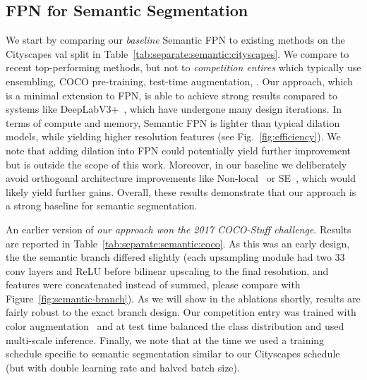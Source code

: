 \documentclass[10pt,twocolumn,letterpaper]{article}
\makeatletter
\newcommand{\x}{}
\renewcommand\paragraph{\@startsection{paragraph}{4}{\z@}{.5em \@plus1ex \@minus.1ex}{-.5em}{\normalfont\normalsize\bfseries}}
\makeatother
\begin{document}
{\subsection{FPN for Semantic Segmentation}

\paragraph{Cityscapes:} We start by comparing our \emph{baseline} Semantic FPN to existing methods on the Cityscapes val split in Table~\ref{tab:separate:semantic:cityscapes}. We compare to recent top-performing methods, but not to \emph{competition entires} which typically use ensembling, COCO pre-training, test-time augmentation, \etc. Our approach, which is a minimal extension to FPN, is able to achieve strong results compared to systems like DeepLabV3+~\cite{deeplabV3plus}, which have undergone many design iterations. In terms of compute and memory, Semantic FPN is lighter than typical dilation models, while yielding higher resolution features (see Fig.~\ref{fig:efficiency}). We note that adding dilation into FPN could potentially yield further improvement but is outside the scope of this work. Moreover, in our baseline we deliberately avoid orthogonal architecture improvements like Non-local~\cite{wang2018non} or SE~\cite{hu2017squeeze}, which would likely yield further gains. Overall, these results demonstrate that our approach is a strong baseline for semantic segmentation.

\paragraph{COCO:} An earlier version of \emph{our approach won the 2017 COCO-Stuff challenge}. Results are reported in Table~\ref{tab:separate:semantic:coco}. As this was an early design, the the semantic branch differed slightly (each upsampling module had two 3\x3 conv layers and ReLU before bilinear upscaling to the final resolution, and features were concatenated instead of summed, please compare with Figure~\ref{fig:semantic-branch}). As we will show in the ablations shortly, results are fairly robust to the exact branch design. Our competition entry was trained with color augmentation~\cite{liu2016ssd} and at test time balanced the class distribution and used multi-scale inference. Finally, we note that at the time we used a training schedule specific to semantic segmentation similar to our Cityscapes schedule (but with double learning rate and halved batch size).

}
\end{document}
